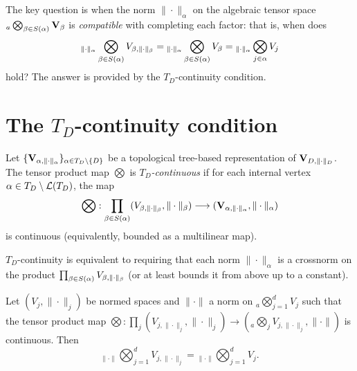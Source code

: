 The key question is when the norm $\|\cdot\|_\alpha$ on the algebraic
tensor space ${}_a\bigotimes_{\beta \in S(\alpha)} \mathbf{V}_\beta$ is
\emph{compatible} with completing each factor: that is, when does
\begin{equation}
\label{eq:top_TBT_identity}
    {}_{\|\cdot\|_\alpha}\bigotimes_{\beta \in S(\alpha)}
    V_{\beta,\|\cdot\|_\beta}
    =
    {}_{\|\cdot\|_\alpha}\bigotimes_{\beta \in S(\alpha)} V_\beta
    =
    {}_{\|\cdot\|_\alpha}\bigotimes_{j \in \alpha} V_j
\end{equation}
hold? The answer is provided by the $T_D$-continuity condition.

\section{The $T_D$-continuity condition}
\label{sec:topTBT:continuity}

\begin{definition}
\label{def:TD_continuous}
Let $\{\mathbf{V}_{\alpha,\|\cdot\|_\alpha}\}_{\alpha \in T_D \setminus \{D\}}$ be a topological
tree-based representation of $\mathbf{V}_{D,\|\cdot\|_D}$. The tensor product map
$\bigotimes$ is \emph{$T_D$-continuous} if for each internal vertex
$\alpha \in T_D \setminus \mathcal{L}(T_D)$, the map
\begin{equation}
\label{eq:TD_continuous}
    \bigotimes :
    \prod_{\beta \in S(\alpha)}
    (V_{\beta,\|\cdot\|_\beta}, \|\cdot\|_\beta)
    \longrightarrow
    (\mathbf{V}_{\alpha,\|\cdot\|_\alpha}, \|\cdot\|_\alpha)
\end{equation}
is continuous (equivalently, bounded as a multilinear map).
\end{definition}

$T_D$-continuity is equivalent to requiring that each norm
$\|\cdot\|_\alpha$ is a crossnorm on the product
$\prod_{\beta \in S(\alpha)} V_{\beta,\|\cdot\|_\beta}$ (or
at least bounds it from above up to a constant).

\begin{lemma}
\label{lem:TD_continuous_identification}
Let $(V_j, \|\cdot\|_j)$ be normed spaces and $\|\cdot\|$ a norm on
${}_a\bigotimes_{j=1}^d V_j$ such that the tensor product map
$\bigotimes: \prod_j (V_{j,\|\cdot\|_j}, \|\cdot\|_j) \to
({}_a\bigotimes_j V_{j,\|\cdot\|_j}, \|\cdot\|)$ is continuous. Then
\begin{equation*}
    {}_{\|\cdot\|}\bigotimes_{j=1}^d V_{j,\|\cdot\|_j}
    = {}_{\|\cdot\|}\bigotimes_{j=1}^d V_j.
\end{equation*}
\end{lemma}

